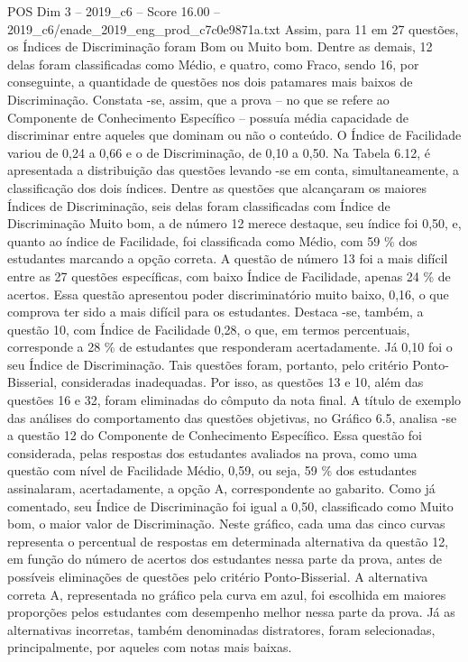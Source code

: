 \begin{textsample}{POS Dim 3 – 2019\_c6 – Score 16.00 – 2019\_c6/enade\_2019\_eng\_prod\_c7c0e9871a.txt}
Assim, para 11 em 27 questões, os Índices de Discriminação foram Bom ou Muito bom.
Dentre as demais, 12 delas foram classificadas como Médio, e quatro, como Fraco, sendo 16, por conseguinte, a quantidade de questões nos dois patamares mais baixos de Discriminação.
Constata -se, assim, que a prova – no que se refere ao Componente de Conhecimento Específico – possuía média capacidade de discriminar entre aqueles que dominam ou não o conteúdo.
O Índice de Facilidade variou de 0,24 a 0,66 e o de Discriminação, de 0,10 a 0,50.
Na Tabela 6.12, é apresentada a distribuição das questões levando -se em conta, simultaneamente, a classificação dos dois índices.
Dentre as questões que alcançaram os maiores Índices de Discriminação, seis delas foram classificadas com Índice de Discriminação Muito bom, a de número 12 merece destaque, seu índice foi 0,50, e, quanto ao índice de Facilidade, foi classificada como Médio, com 59 \% dos estudantes marcando a opção correta.
A questão de número 13 foi a mais difícil entre as 27 questões específicas, com baixo Índice de Facilidade, apenas 24 \% de acertos.
Essa questão apresentou poder discriminatório muito baixo, 0,16, o que comprova ter sido a mais difícil para os estudantes.
Destaca -se, também, a questão 10, com Índice de Facilidade 0,28, o que, em termos percentuais, corresponde a 28 \% de estudantes que responderam acertadamente.
Já 0,10 foi o seu Índice de Discriminação.
Tais questões foram, portanto, pelo critério Ponto-Bisserial, consideradas inadequadas.
Por isso, as questões 13 e 10, além das questões 16 e 32, foram eliminadas do cômputo da nota final.
A título de exemplo das análises do comportamento das questões objetivas, no Gráfico 6.5, analisa -se a questão 12 do Componente de Conhecimento Específico.
Essa questão foi considerada, pelas respostas dos estudantes avaliados na prova, como uma questão com nível de Facilidade Médio, 0,59, ou seja, 59 \% dos estudantes assinalaram, acertadamente, a opção A, correspondente ao gabarito.
Como já comentado, seu Índice de Discriminação foi igual a 0,50, classificado como Muito bom, o maior valor de Discriminação.
Neste gráfico, cada uma das cinco curvas representa o percentual de respostas em determinada alternativa da questão 12, em função do número de acertos dos estudantes nessa parte da prova, antes de possíveis eliminações de questões pelo critério Ponto-Bisserial.
A alternativa correta A, representada no gráfico pela curva em azul, foi escolhida em maiores proporções pelos estudantes com desempenho melhor nessa parte da prova.
Já as alternativas incorretas, também denominadas distratores, foram selecionadas, principalmente, por aqueles com notas mais baixas.

\end{textsample}
